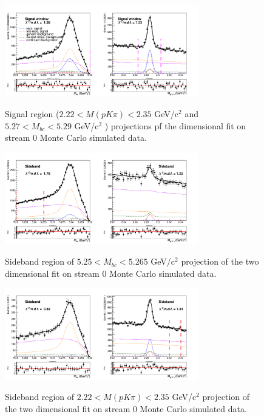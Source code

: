 \newpage

\begin{figure}[h!]
{\includegraphics[width=0.75\textwidth]{A1-Appendix/figs/Signal_window_Total_2DFit_stream0_free_sigmas_free_sigmas.png}}
\caption{Signal region ($2.22 < M(p K \pi) < 2.35$ GeV/c$^2$ and $5.27 < M_{bc} < 5.29$ GeV/c$^2$ ) projections pf the dimensional fit on stream 0 Monte Carlo simulated data.}
\label{fig:stream0_sig_window_Total2Dfit_charged_corrLambdaC}
\end{figure}

\begin{figure}[h!]
{\includegraphics[width=0.75\textwidth]{A1-Appendix/figs/Mbc_Sideband_Total_2DFit_stream0_free_sigmas.png}}
\caption{Sideband region of $5.25 < M_{bc} < 5.265$ GeV/c$^2$ projection of the two dimensional fit on stream 0 Monte Carlo simulated data.}
\label{fig:stream0_MbcSideband_Total2Dfit_charged_corrLambdaC}
\end{figure}

\begin{figure}[b]
{\includegraphics[width=0.75\textwidth]{A1-Appendix/figs/InvM_Sideband_Total_2DFit_stream0_free_sigmas.png}}
\caption{Sideband region of $2.22 < M(p K \pi) < 2.35$ GeV/c$^2$ projection of the two dimensional fit on stream 0 Monte Carlo simulated data.}
\label{fig:stream0_InvMSideband_Total2Dfit_charged_corrLambdaC}
\end{figure}

